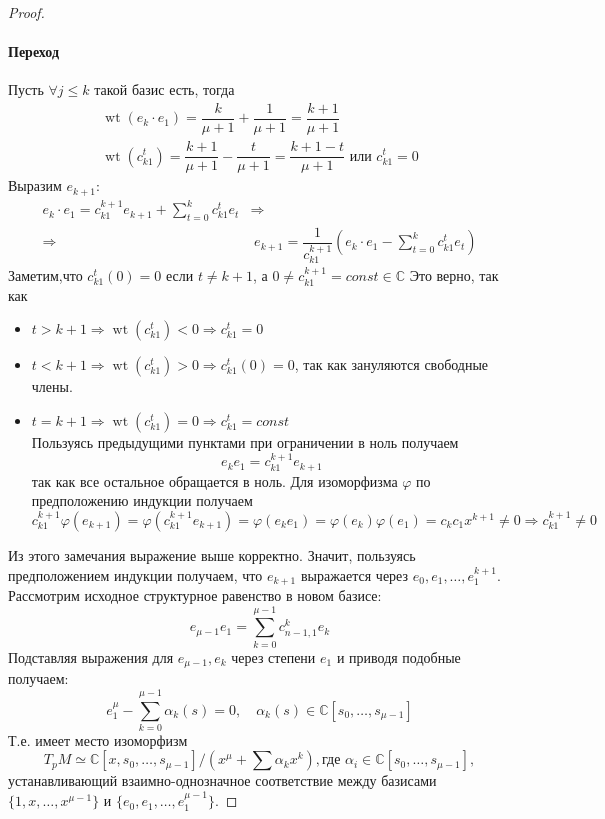 \documentclass[a4paper, 10pt]{article}
\theoremstyle{plain}
\begin{document}
\begin{proof}
\paragraph{Переход}
   Пусть \(\forall j \leq k\) такой базис есть, тогда \begin{gather*}
       \operatorname{wt}(e_k\cdot e_1) = \dfrac{k}{\mu + 1} + \dfrac{1}{\mu + 1} = \dfrac{k + 1}{\mu + 1}\\
       \operatorname{wt}(c^t_{k1}) = \dfrac{k+1}{\mu+1} - \dfrac{t}{\mu +1} = \dfrac{k+1-t}{\mu + 1} \text{ или } c^t_{k1} = 0
   \end{gather*}
   Выразим \(e_{k+1}\): 
   \begin{align*}
       e_k \cdot e_1 = c_{k1}^{k+1} e_{k+1} + \sum^k_{t = 0} c^t_{k1} e_t &\Rightarrow\\
       \Rightarrow & \hspace{3pt}e_{k+1} = \dfrac{1}{c_{k1}^{k+1}} \left( e_k\cdot e_1  - \sum^k_{t = 0} c^t_{k1} e_t \right)
   \end{align*}
   Заметим,что 
     \(c^t_{k1}(0) = 0\) если \(t \neq k+1\), а \(0 \neq c^{k+1}_{k1} = const \in \mathbb{C}\)
	Это верно, так как 
       \begin{itemize}
           \item \(t > k+1 \Rightarrow\operatorname{wt}(c^t_{k1}) < 0 \Rightarrow  c^t_{k1} = 0\)
           \item \(t < k+1 \Rightarrow\operatorname{wt}(c^t_{k1}) > 0 \Rightarrow c^t_{k1}(0) = 0\), так как зануляются свободные члены.
           \item \(t = k+1 \Rightarrow\operatorname{wt}(c^t_{k1}) = 0 \Rightarrow c^t_{k1} = const\)\\
           Пользуясь предыдущими пунктами при ограничении в ноль получаем \[e_ke_1 = c_{k1}^{k+1}e_{k+1}\] так как все остальное обращается в ноль. Для изоморфизма \(\varphi\) по предположению индукции получаем 
           \[c_{k1}^{k+1}\varphi(e_{k+1}) = \varphi(c_{k1}^{k+1}e_{k+1}) =\varphi(e_ke_1) = \varphi(e_k)\varphi(e_1) = c_kc_1x^{k+1} \neq 0 \Rightarrow c_{k1}^{k+1} \neq 0\]
       \end{itemize}
   Из этого замечания выражение выше корректно. Значит, пользуясь предположением индукции получаем, что \(e_{k+1}\) выражается через \(e_0, e_1, \dots, e_1^{k+1}\).\\
   Рассмотрим исходное структурное равенство в новом базисе:
   \[e_{\mu-1} e_1 = \sum_{k = 0}^{\mu -1} c^k_{n-1,1} e_k\]
   Подставляя выражения для \(e_{\mu -1}, e_k\) через степени \(e_1\) и приводя подобные получаем: \[e_1^{\mu}- \sum^{\mu -1}_{k = 0}\alpha_k(s) = 0, \quad \alpha_k(s) \in \mathbb{C}[s_0, \dots, s_{\mu-1}]\]
   Т.е. имеет место изоморфизм
   \[T_pM \simeq \mathbb{C}[x, s_0, \dots,s_{\mu-1}]/(x^{\mu} + \sum \alpha_k x^k), \text{где } \alpha_i \in \mathbb{C}[s_0, \dots, s_{\mu-1}],\] устанавливающий взаимно-однозначное соответствие между базисами \(\{1, x, \dots, x^{\mu-1}\}\) и \(\{e_0, e_1, \dots, e^{\mu-1}_1\}\).
\end{proof}
\end{document}
